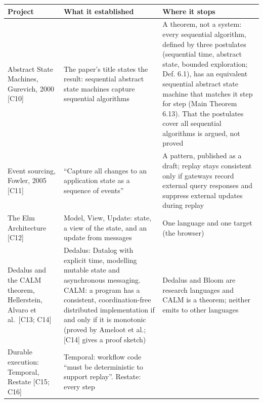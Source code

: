 \documentclass[10pt,letterpaper]{article}
\begin{document}
{\footnotesize\setlength{\tabcolsep}{3.8pt}\renewcommand{\arraystretch}{1.15}
\begin{longtable}[]{@{}
  >{\raggedright\arraybackslash}p{}
  >{\raggedright\arraybackslash}p{}
  >{\raggedright\arraybackslash}p{}@{}}
\toprule\noalign{}
\begin{minipage}[b]{\linewidth}\raggedright
\textbf{Project}
\end{minipage} & \begin{minipage}[b]{\linewidth}\raggedright
\textbf{What it established}
\end{minipage} & \begin{minipage}[b]{\linewidth}\raggedright
\textbf{Where it stops}
\end{minipage} \\
\midrule\noalign{}
\endhead
\bottomrule\noalign{}
\endlastfoot
Abstract State Machines, Gurevich, 2000 {[}C10{]} & The paper's title
states the result: sequential abstract state machines capture sequential
algorithms & A theorem, not a system: every sequential algorithm,
defined by three postulates (sequential time, abstract state, bounded
exploration; Def. 6.1), has an equivalent sequential abstract state
machine that matches it step for step (Main Theorem 6.13). That the
postulates cover all sequential algorithms is argued, not proved \\
Event sourcing, Fowler, 2005 {[}C11{]} & ``Capture all changes to an
application state as a sequence of events'' & A pattern, published as a
draft; replay stays consistent only if gateways record external query
responses and suppress external updates during replay \\
The Elm Architecture {[}C12{]} & Model, View, Update: state, a view of
the state, and an update from messages & One language and one target
(the browser) \\
Dedalus and the CALM theorem, Hellerstein, Alvaro et al.~{[}C13; C14{]}
& Dedalus: Datalog with explicit time, modelling mutable state and
asynchronous messaging. CALM: a program has a consistent,
coordination-free distributed implementation if and only if it is
monotonic (proved by Ameloot et al.; {[}C14{]} gives a proof sketch) &
Dedalus and Bloom are research languages and CALM is a theorem; neither
emits to other languages \\
Durable execution: Temporal, Restate {[}C15; C16{]} & Temporal: workflow
code ``must be deterministic to support replay''. Restate: every step

\end{longtable}}
\end{document}
